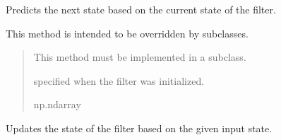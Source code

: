 \documentclass[letterpaper,10pt,english]{sphinxmanual}
\begin{document}
\begin{fulllineitems}
\begin{fulllineitems}
\begin{quote}
\begin{description}
\begin{itemize}
\end{itemize}

\end{description}\end{quote}

\end{fulllineitems}


\begin{fulllineitems}
\label{\detokenize{generated/eflatun_uav.filters:eflatun_uav.filters.BaseFilter.predict}}
\pysigstartsignatures
{}
\pysigstopsignatures
\sphinxAtStartPar
Predicts the next state based on the current state of the filter.

\sphinxAtStartPar
This method is intended to be overridden by subclasses.
\begin{quote}\begin{description}
\sphinxAtStartPar
{} \textendash{} This method must be implemented in a subclass.

\sphinxAtStartPar
\begin{description}
\sphinxAtStartPar
specified when the filter was initialized.

\end{description}


\sphinxAtStartPar
np.ndarray

\end{description}\end{quote}

\end{fulllineitems}


\begin{fulllineitems}
\label{\detokenize{generated/eflatun_uav.filters:eflatun_uav.filters.BaseFilter.update}}
\pysigstartsignatures
{}
\pysigstopsignatures
\sphinxAtStartPar
Updates the state of the filter based on the given input state.


\end{fulllineitems}
\end{fulllineitems}
\end{document}
